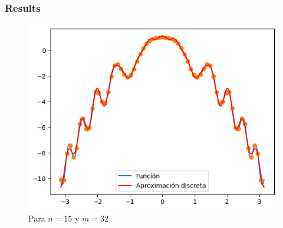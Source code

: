 \begin{frame}
    \frametitle{Results}

    \begin{figure}
        \centering
        \includegraphics[width=.5\paperwidth]{p7-A-discreta3.png}
        \caption{Para $n=15$ y $m=32$}
        \label{fig:enter-label}
    \end{figure}
\end{frame}